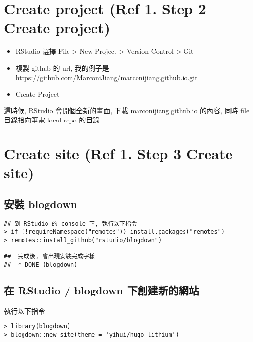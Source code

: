 \documentclass[
]{book}
\providecommand{\tightlist}{%
  \setlength{\itemsep}{0pt}\setlength{\parskip}{0pt}}
\begin{document}
\hypertarget{create-project-ref-1.-step-2-create-project}{%
\section{Create project (Ref 1. Step 2 Create project)}\label{create-project-ref-1.-step-2-create-project}}

\begin{itemize}
\tightlist
\item
  RStudio 選擇 File \textgreater{} New Project \textgreater{} Version Control \textgreater{} Git
\item
  複製 github 的 url, 我的例子是 \url{https://github.com/MarconiJiang/marconijiang.github.io.git}
\item
  Create Project
\end{itemize}

這時候, RStudio 會開個全新的畫面, 下載 marconijiang.github.io 的內容, 同時 file 目錄指向筆電 local repo 的目錄

\hypertarget{create-site-ref-1.-step-3-create-site}{%
\section{Create site (Ref 1. Step 3 Create site)}\label{create-site-ref-1.-step-3-create-site}}

\hypertarget{ux5b89ux88dd-blogdown}{%
\subsection{安裝 blogdown}\label{ux5b89ux88dd-blogdown}}

\begin{verbatim}
## 到 RStudio 的 console 下, 執行以下指令
> if (!requireNamespace("remotes")) install.packages("remotes")
> remotes::install_github("rstudio/blogdown")

##  完成後, 會出現安裝完成字樣
##  * DONE (blogdown)
\end{verbatim}

\hypertarget{ux5728-rstudio-blogdown-ux4e0bux5275ux5efaux65b0ux7684ux7db2ux7ad9}{%
\subsection{在 RStudio / blogdown 下創建新的網站}\label{ux5728-rstudio-blogdown-ux4e0bux5275ux5efaux65b0ux7684ux7db2ux7ad9}}

執行以下指令

\begin{verbatim}
> library(blogdown)
> blogdown::new_site(theme = 'yihui/hugo-lithium')
\end{verbatim}
\end{document}
